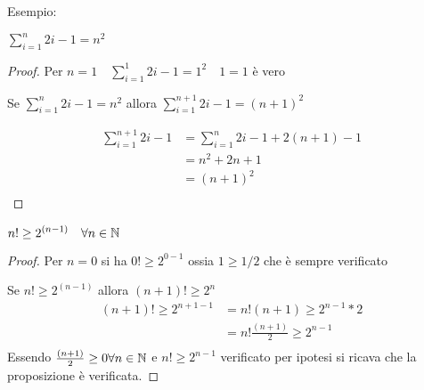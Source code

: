 Esempio:\newline
\begin{thm}
 $\displaystyle \sum_{i = 1}^n 2i-1 = n^2$
\end{thm}

\begin{proof}
Per $n = 1 \quad \displaystyle \sum_{i = 1}^1 2i-1 = 1^2 \quad 1 = 1$ è vero

Se $\displaystyle \sum_{i = 1}^n 2i-1 = n^2$ allora
$\displaystyle \sum_{i = 1}^{n+1} 2i-1 = (n+1)^2$

\begin{equation*}
\begin{split}
  \sum_{i=1}^{n+1} 2i-1 & = \sum_{i=1}^n 2i-1 + 2(n+1) - 1 \\
         & = n^2 + 2n + 1 \\
         & = (n+1)^2 \\
\end{split}
\end{equation*}
\end{proof}

\begin{thm}
    $\displaystyle n! \geq 2^{(n-1)} \quad \forall n \in \mathbb{N}$
\end{thm}
\begin{proof}
Per $n = 0$ si ha $0! \geq 2^{0-1}$ ossia $ 1 \geq 1/2$ che è sempre verificato

Se $n! \geq 2^{(n-1)}$ allora $(n+1)! \geq 2^n$
\begin{equation*}
\begin{split}
(n+1)! \geq 2^{n+1-1} & = n! (n+1) \geq 2^{n-1} * 2 \\
                      & = n! \frac{(n+1)}{2} \geq 2^{n-1} \\
\end{split}
\end{equation*}
Essendo $\frac{(n+1)}{2} \geq 0 \forall n \in \mathbb{N}$ e $n! \geq 2^{n-1}$ verificato per ipotesi
si ricava che la proposizione è verificata.
\end{proof}
